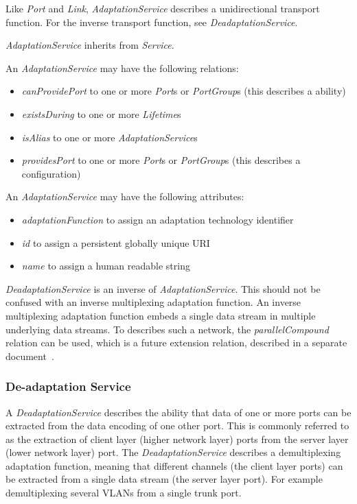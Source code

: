 Like \emph{Port} and \emph{Link}, \emph{AdaptationService} describes a unidirectional transport function. For the inverse transport function, see \emph{DeadaptationService}.

\emph{AdaptationService} inherits from \emph{Service}.

An \emph{AdaptationService} may have the following relations:
\begin{itemize}
    \item \emph{canProvidePort} to one or more \emph{Port}s or \emph{PortGroup}s (this describes a ability)
    \item \emph{existsDuring} to one or more \emph{Lifetime}s
    \item \emph{isAlias} to one or more \emph{AdaptationService}s
    \item \emph{providesPort} to one or more \emph{Port}s or \emph{PortGroup}s (this describes a configuration)
\end{itemize}

An \emph{AdaptationService} may have the following attributes:
\begin{itemize}
    \item \emph{adaptationFunction} to assign an adaptation technology identifier
    \item \emph{id} to assign a persistent globally unique URI
    \item \emph{name} to assign a human readable string
\end{itemize}

\emph{DeadaptationService} is an inverse of \emph{AdaptationService}. This should not be confused with an inverse multiplexing adaptation function. An inverse multiplexing adaptation function embeds a single data stream in multiple underlying data streams. To describes such a network, the \emph{parallelCompound} relation can be used, which is a future extension relation, described in a separate document~\cite{nml-experimental}.



\subsubsection{De-adaptation Service}%
\label{class:deadaptation_service}

A \emph{DeadaptationService} describes the ability that data of one or more ports can be extracted from the data encoding of one other port. This is commonly referred to as the extraction of client layer (higher network layer) ports from the server layer (lower network layer) port. The \emph{DeadaptationService} describes a demultiplexing adaptation function, meaning that different channels (the client layer ports) can be extracted from a single data stream (the server layer port). For example demultiplexing several VLANs from a single trunk port.

